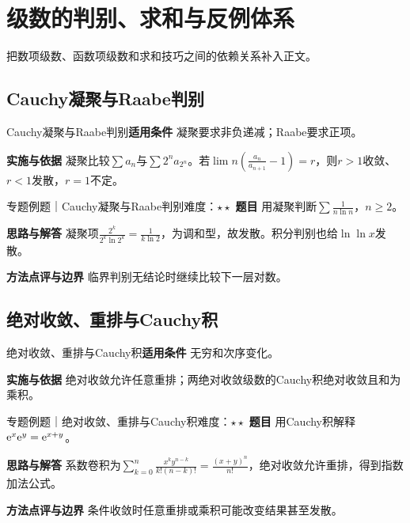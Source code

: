 \section{级数的判别、求和与反例体系}\label{mat:series_methods}
\begin{examtip}把数项级数、函数项级数和求和技巧之间的依赖关系补入正文。\end{examtip}
\subsection{Cauchy凝聚与Raabe判别}\label{mat:series_methods:condense}
\begin{method}{Cauchy凝聚与Raabe判别}\textbf{适用条件} 凝聚要求非负递减；Raabe要求正项。\par\textbf{实施与依据} 凝聚比较$\sum a_n$与$\sum2^na_{2^n}$。若$\lim n(\frac{a_n}{a_{n+1}}-1)=r$，则$r>1$收敛、$r<1$发散，$r=1$不定。\end{method}
\begin{example}{专题例题｜Cauchy凝聚与Raabe判别}{难度：$\star\star$}
\textbf{题目} 用凝聚判断$\sum\frac{1}{n\ln n}$，$n\ge2$。\par\textbf{思路与解答} 凝聚项$\frac{2^k}{2^k\ln2^k}=\frac{1}{k\ln2}$，为调和型，故发散。积分判别也给$\ln\ln x$发散。\par\textbf{方法点评与边界} 临界判别无结论时继续比较下一层对数。
\end{example}
\subsection{绝对收敛、重排与Cauchy积}\label{mat:series_methods:rearrange}
\begin{method}{绝对收敛、重排与Cauchy积}\textbf{适用条件} 无穷和次序变化。\par\textbf{实施与依据} 绝对收敛允许任意重排；两绝对收敛级数的Cauchy积绝对收敛且和为乘积。\end{method}
\begin{example}{专题例题｜绝对收敛、重排与Cauchy积}{难度：$\star\star$}
\textbf{题目} 用Cauchy积解释$\mathrm{e}^x\mathrm{e}^y=\mathrm{e}^{x+y}$。\par\textbf{思路与解答} 系数卷积为$\sum_{k=0}^n\frac{x^ky^{n-k}}{k!(n-k)!}=\frac{(x+y)^n}{n!}$，绝对收敛允许重排，得到指数加法公式。\par\textbf{方法点评与边界} 条件收敛时任意重排或乘积可能改变结果甚至发散。
\end{example}
